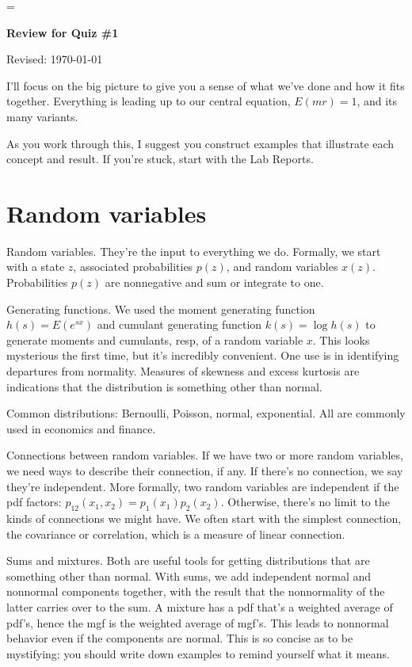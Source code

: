 \documentclass[11pt]{article}
\begin{document}
\parskip=\bigskipamount
\parindent=0.0in
\thispagestyle{empty}


\bigskip\bigskip
\centerline{\Large \bf Review for Quiz \#1}
\centerline{Revised: \today}

\bigskip
I'll focus on the big picture to give you a sense of
what we've done and how it fits together.
Everything is leading up to our central equation,
$ E(mr) = 1$, and its many variants.

As you work through this, I suggest you construct examples that
illustrate each concept and result.
If you're stuck, start with the Lab Reports.


\section*{Random variables}

Random variables.  They're the input to everything we do.
Formally, we start with a state $z$, associated probabilities $p(z)$,
and random variables $x(z)$.
Probabilities $p(z)$ are nonnegative and sum or integrate to one.

Generating functions.
We used the moment generating function $h(s) = E (e^{sx})$
and cumulant generating function $k(s) = \log h(s)$ to
generate moments and cumulants, resp, of a random variable $x$.
This looks mysterious the first time, but it's incredibly convenient.
One use is in identifying departures from normality.
Measures of skewness and excess kurtosis are
indications that the distribution is something other than normal.

Common distributions:  Bernoulli, Poisson, normal, exponential.
All are commonly used in economics and finance.

Connections between random variables.
If we have two or more random variables, we need ways to describe
their connection, if any.
If there's no connection, we say they're independent.
More formally, two random variables are independent if the pdf factors:
$ p_{12}(x_1, x_2) = p_1(x_1) p_2(x_2) $.
Otherwise, there's no limit to the kinds of connections we might have.
We often start with the simplest connection,
the covariance or correlation, which is a measure of linear connection.

Sums and mixtures.
Both are useful tools for getting distributions that are something other than normal.
With sums, we add independent normal and nonnormal components together,
with the result that the nonnormality of the latter carries over to the sum.
A mixture has a pdf that's a weighted average
of pdf's, hence the mgf is the weighted average of mgf's.
This leads to nonnormal behavior even if the components are normal.
This is so concise as to be mystifying; you should write down examples
to remind yourself what it means.
\end{document}
